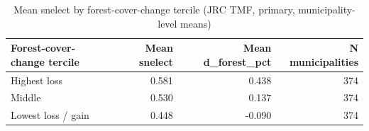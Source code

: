 \begin{table}

\caption{Mean snelect by forest-cover-change tercile (JRC TMF, primary, municipality-level means)}
\centering
\begin{tabular}[t]{lrrr}
\toprule
Forest-cover-change tercile & Mean snelect & Mean d\_forest\_pct & N municipalities\\
\midrule
Highest loss & 0.581 & 0.438 & 374\\
Middle & 0.530 & 0.137 & 374\\
Lowest loss / gain & 0.448 & -0.090 & 374\\
\bottomrule
\end{tabular}
\end{table}
